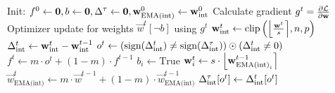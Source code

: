 \begin{algorithm}[t]
	\caption{QAT with iterative weight freezing}
	\label{alg:qat_freezing}
	\begin{algorithmic}[1]
	    \STATE Init: $f^0 \gets \vec{0}, b \gets \vec{0}, \Delta^{\tau} \gets \vec{0}, \vec{w}^0_{\text{EMA(int)}} \gets \vec{w}_\INT^0$
	        \STATE Calculate gradient $g^t = \frac{\partial\vec{\tlossb}}{\partial \vec{w}}$
	        \STATE Optimizer update for weights $\vec{w}^t[\neg b]$ using $g^t$
	        \STATE $\vec{w}^t_{\INT} \gets  \text{clip} \left(\round*{\frac{\vec{w}^t}{\ct{s}}}, \ct{n}, \ct{p}\right)$
	        \STATE $\Delta^t_{\INT} \gets \vec{w}^t_{\INT} - \vec{w}^{t-1}_{\INT}$
	        \STATE $o^t \gets (\text{sign}(\Delta^t_{\INT}) \neq \text{sign}(\Delta^{\tau}_{\INT})) \odot (\Delta^t_{\INT} \neq 0) $
	        \STATE $f^t \gets m \cdot o^t + (1-m) \cdot f^{t-1}$
	                \STATE $b_i \gets \text{True}$ %
	                \STATE $\vec{w}_i^{t} \gets \ct{s} \cdot \round*{\vec{w}^{t-1}_{\text{EMA(int)}_i}}$  %
	            \ENDIF
	        \ENDFOR
            \STATE $\vec{w}^t_{\text{EMA(int)}} \gets m \cdot \vec{w}^{t-1} + (1-m) \cdot \vec{w}^{t-1}_{\text{EMA(int)}}$\label{lst:weigth_ema}
	        \STATE $\Delta^{\tau}_{\INT}[o^t] \gets \Delta^t_{\INT}[o^t]$
	            
		\ENDFOR
	
	\end{algorithmic} 
\end{algorithm}
